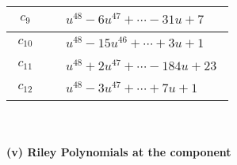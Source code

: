 \documentclass[1p]{elsarticle_modified}
\theoremstyle{definition}
\begin{document}
\begin{tabular}{m{50pt}|m{274pt}}
\hline $$\begin{aligned}c_{9}\end{aligned}$$&$\begin{aligned}
&u^{48}-6 u^{47}+\cdots-31 u+7
\end{aligned}$\\
\hline $$\begin{aligned}c_{10}\end{aligned}$$&$\begin{aligned}
&u^{48}-15 u^{46}+\cdots+3 u+1
\end{aligned}$\\
\hline $$\begin{aligned}c_{11}\end{aligned}$$&$\begin{aligned}
&u^{48}+2 u^{47}+\cdots-184 u+23
\end{aligned}$\\
\hline $$\begin{aligned}c_{12}\end{aligned}$$&$\begin{aligned}
&u^{48}-3 u^{47}+\cdots+7 u+1
\end{aligned}$\\
\hline
\end{tabular}\\~\\
\newpage\renewcommand{\arraystretch}{1}
\flushleft \textbf{(v) Riley Polynomials at the component}\newline \\
\end{document}
